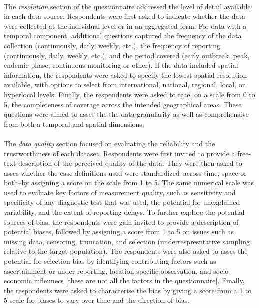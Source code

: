 \documentclass{article}
\begin{document}
\paragraph{}The \textit{resolution} section of the questionnaire addressed the level of detail available in each data source. Respondents were first asked to indicate whether the data were collected at the individual level or in an aggregated form. For data with a temporal component, additional questions captured the frequency of the data collection (continuously, daily, weekly, etc.), the frequency of reporting (continuously, daily, weekly, etc.), and the period covered (early outbreak, peak, endemic phase, continuous monitoring or other). If the data included spatial information, the respondents were asked to specify the lowest spatial resolution available, with options to select from international, national, regional, local, or hyperlocal levels. Finally, the respondents were asked to rate, on a scale from 0 to 5, the completeness of coverage across the intended geographical areas. These questions were aimed to asses the the data granularity as well as comprehensive from both a temporal and spatial dimensions. 

\paragraph{}The \textit{data quality} section focused on evaluating the reliability and the trustworthiness of each dataset. Respondents were first invited to provide a free-text description of the perceived quality of the data. They were then asked to asses whether the case definitions used were standardized--across time, space or both--by assigning a score on the scale from 1 to 5. The same numerical scale was used to evaluate key factors of measurement quality, such as sensitivity and specificity of any diagnostic test that was used, the potential for unexplained variability, and the extent of reporting delays. To further explore the potential sources of bias, the respondents were gain invited to provide a description of potential biases, followed by assigning a score from 1 to 5 on issues such as missing data, censoring, truncation, and selection (underrespresntative sampling relative to the target population). The respondents were also asked to asses the potential for selection bias by identifying contributing factors such as ascertainment or under reporting, location-specific observation, and socio-economic infleunecs [these are not all the factors in the questionnaire]. Finally, the respondents were asked to characterise the bias by giving a score from a 1 to 5 scale for biases to vary over time and the direction of bias. 
\end{document}
